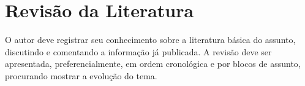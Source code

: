 
\chapter{Revisão da Literatura}\label{cap:revisaodaliteratura}

O autor deve registrar seu conhecimento sobre a literatura básica do assunto, discutindo e comentando a informação já publicada. A revisão deve ser apresentada, preferencialmente, em ordem cronológica e por blocos de assunto, procurando mostrar a evolução do tema.
